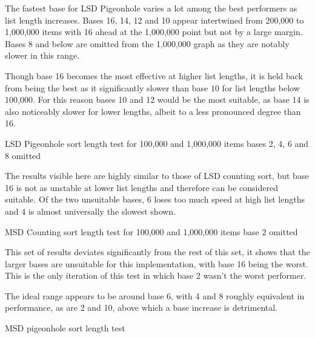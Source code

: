 \documentclass[12pt]{article}
\begin{document}
	The fastest base for LSD Pigeonhole varies a lot among the best performers as list length increases. Bases 16, 14, 12 and 10 appear intertwined from 200,000 to 1,000,000 items with 16 ahead at the 1,000,000 point but not by a large margin. Bases 8 and below are omitted from the 1,000,000 graph as they are notably slower in this range.
	\par
	Though base 16 becomes the most effective at higher list lengths, it is held back from being the best as it significantly slower than base $10$ for list lengths below $100$,$000$. For this reason bases 10 and 12 would be the most suitable, as base 14 is also noticeably slower for lower lengths, albeit to a less pronounced degree than 16.
	\begin{table}[h]
		\centering
		\captionsetup{type=figure}
			\caption{LSD Pigeonhole sort length test for 100,000 and 1,000,000 items \newline bases 2, 4, 6 and 8 omitted\label{fig:lsdplength}}
		\end{table}
		The results visible here are highly similar to those of LSD counting sort, but base 16 is not as unstable at lower list lengths and therefore can be considered suitable. Of the two unsuitable bases, 6 loses too much speed at high list lengths and 4 is almost universally the slowest shown.
		\begin{table}[h]
			\centering
			\captionsetup{type=figure}
				\caption{MSD Counting sort length test for 100,000 and 1,000,000 items \newline base 2 omitted\label{fig:msdclength}}
			\end{table}
			\pagebreak
			This set of results deviates significantly from the rest of this set, it shows that the larger bases are unsuitable for this implementation, with base 16 being the worst. This is the only iteration of this test in which base 2 wasn't the worst performer.
			\par
			The ideal range appears to be around base 6, with 4 and 8 roughly equivalent in performance, as are 2 and 10, above which a base increase is detrimental.
			\vspace{-0.5cm}
			\begin{table}[h]
				\captionsetup{type=figure}
				\centering
			\caption{MSD pigeonhole sort length test\label{fig:msdplength}}	
	\end{table}
	\vspace{-1cm}
\end{document}
